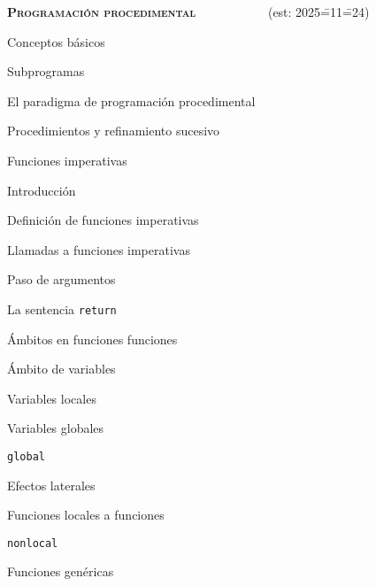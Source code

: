 \begin{longenum}
    \item \textbf{\textsc{Programación procedimental}} \ \ \ \ \ \ \ \ \ \ \ (est: 2025\==11\==24)
    \begin{longenum}
        \item Conceptos básicos
        \begin{longenum}
            \item Subprogramas
            \item El paradigma de programación procedimental
            \item Procedimientos y refinamiento sucesivo
        \end{longenum}
        \item Funciones imperativas
        \begin{longenum}
            \item Introducción
            \item Definición de funciones imperativas
            \item Llamadas a funciones imperativas
            \item Paso de argumentos
            \item La sentencia \texttt{return}
        \end{longenum}
        \item Ámbitos en funciones funciones
        \begin{longenum}
            \item Ámbito de variables
            \begin{longenum}
                \item Variables locales
                \item Variables globales
                \begin{longenum}
                    \item \texttt{global}
                    \item Efectos laterales
                \end{longenum}
            \end{longenum}
            \item Funciones locales a funciones
            \begin{longenum}
                \item \texttt{nonlocal}
            \end{longenum}
        \end{longenum}
        \item Funciones genéricas

\end{longenum}
\end{longenum}
